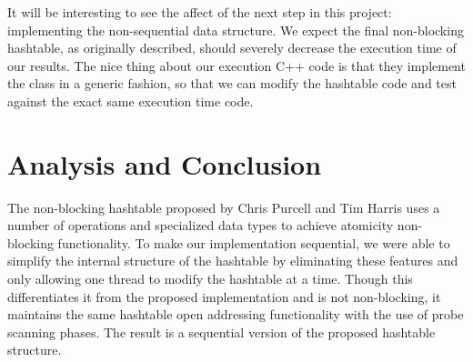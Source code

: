 \documentclass[journal]{IEEEtran}
\begin{document}
It will be interesting to see the affect of the next step in this project: implementing the non-sequential data structure. We expect the final non-blocking hashtable, as originally described, should severely decrease the execution time of our results. The nice thing about our execution C++ code is that they implement the class in a generic fashion, so that we can modify the hashtable code and test against the exact same execution time code.



\section{Analysis and Conclusion}

The non-blocking hashtable proposed by Chris Purcell and Tim Harris uses a number of operations and specialized data types to achieve atomicity non-blocking functionality.  To make our implementation sequential, we were able to simplify the internal structure of the hashtable by eliminating these features and only allowing one thread to modify the hashtable at a time. Though this differentiates it from the proposed implementation and is not non-blocking, it maintains the same hashtable open addressing functionality with the use of probe scanning phases. The result is a sequential version of the proposed hashtable structure.


\ifCLASSOPTIONcaptionsoff
  \newpage
\fi



\end{document}
